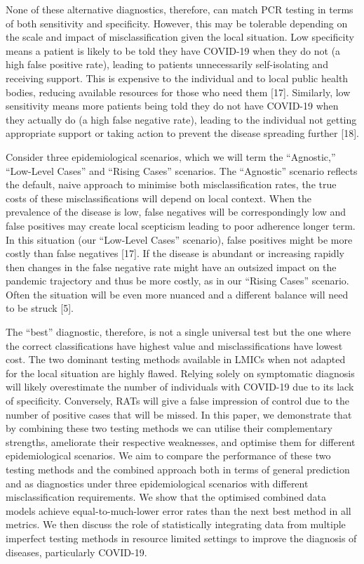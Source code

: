 \documentclass[]{elsarticle} %
\begin{document}
None of these alternative diagnostics, therefore, can match PCR testing in terms of both sensitivity and specificity.
However, this may be tolerable depending on the scale and impact of misclassification given the local situation.
Low specificity means a patient is likely to be told they have COVID-19 when they do not (a high false positive rate), leading to patients unnecessarily self-isolating and receiving support.
This is expensive to the individual and to local public health bodies, reducing available resources for those who need them {[}17{]}.
Similarly, low sensitivity means more patients being told they do not have COVID-19 when they actually do (a high false negative rate), leading to the individual not getting appropriate support or taking action to prevent the disease spreading further {[}18{]}.

Consider three epidemiological scenarios, which we will term the ``Agnostic,'' ``Low-Level Cases'' and ``Rising Cases'' scenarios.
The ``Agnostic'' scenario reflects the default, naive approach to minimise both misclassification rates, the true costs of these misclassifications will depend on local context.
When the prevalence of the disease is low, false negatives will be correspondingly low and false positives may create local scepticism leading to poor adherence longer term.
In this situation (our ``Low-Level Cases'' scenario), false positives might be more costly than false negatives {[}17{]}.
If the disease is abundant or increasing rapidly then changes in the false negative rate might have an outsized impact on the pandemic trajectory and thus be more costly, as in our ``Rising Cases'' scenario.
Often the situation will be even more nuanced and a different balance will need to be struck {[}5{]}.

The ``best'' diagnostic, therefore, is not a single universal test but the one where the correct classifications have highest value and misclassifications have lowest cost.
The two dominant testing methods available in LMICs when not adapted for the local situation are highly flawed.
Relying solely on symptomatic diagnosis will likely overestimate the number of individuals with COVID-19 due to its lack of specificity.
Conversely, RATs will give a false impression of control due to the number of positive cases that will be missed.
In this paper, we demonstrate that by combining these two testing methods we can utilise their complementary strengths, ameliorate their respective weaknesses, and optimise them for different epidemiological scenarios.
We aim to compare the performance of these two testing methods and the combined approach both in terms of general prediction and as diagnostics under three epidemiological scenarios with different misclassification requirements.
We show that the optimised combined data models achieve equal-to-much-lower error rates than the next best method in all metrics.
We then discuss the role of statistically integrating data from multiple imperfect testing methods in resource limited settings to improve the diagnosis of diseases, particularly COVID-19.
\end{document}
